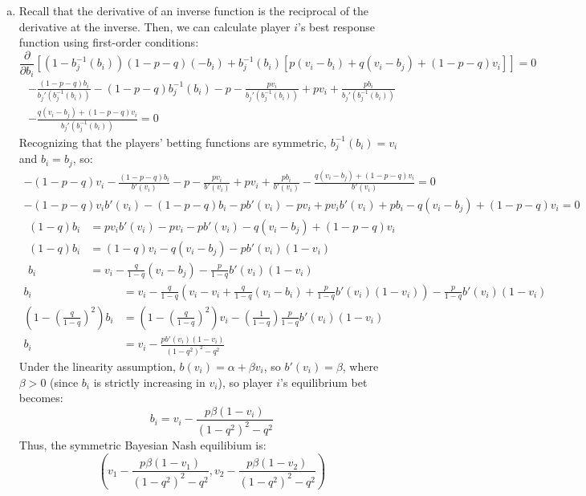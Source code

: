 \documentclass{article}
\newcommand{\binv}[1]{b_j^{-1}\left(#1\right)}
\begin{document}
\begin{enumerate}[(a)]
	
	\item Recall that the derivative of an inverse function is the reciprocal of the derivative at the inverse. Then, we can calculate player $i$'s best response function using first-order conditions:
		$$ \frac{\partial}{\partial b_i}\left[(1-\binv{b_i})(1-p-q)(-b_i) + \binv{b_i}[p(v_i-b_i) + q(v_i-b_j) + (1-p-q)v_i]\right] = 0	$$
		\begin{align*}
			-\frac{(1-p-q)b_i}{b_j'\left(\binv{b_i}\right)} - (1-p-q)\binv{b_i} -p - \frac{pv_i}{b_j'\left(\binv{b_i}\right)} + pv_i + \frac{pb_i}{b_j'\left(\binv{b_i}\right)} 	\\
				- \frac{q(v_i-b_j) + (1-p-q)v_i}{b_j'\left(\binv{b_i}\right)} = 0
		\end{align*}
		Recognizing that the players' betting functions are symmetric, ${\binv{b_i}=v_i}$ and ${b_i=b_j}$, so:
		{\small
		\begin{align*}
			-(1-p-q)v_i - \frac{(1-p-q)b_i}{b'(v_i)}-p-\frac{pv_i}{b'(v_i)} + pv_i + \frac{pb_i}{b'(v_i)} - \frac{q(v_i-b_j) + (1-p-q)v_i}{b'(v_i)} = 0	\\
			-(1-p-q)v_ib'(v_i) - (1-p-q)b_i - pb'(v_i) - pv_i + pv_ib'(v_i) + pb_i - q(v_i-b_j) + (1-p-q)v_i = 0
		\end{align*}
		\begin{align*}
			(1-q)b_i 	&= pv_ib'(v_i) - pv_i - pb'(v_i) - q(v_i - b_j) + (1-p-q)v_i 	\\
			(1-q)b_i 	&= (1-q)v_i - q(v_i-b_j) - pb'(v_i)(1-v_i)						\\
			b_i			&= v_i - \frac{q}{1-q}(v_i-b_j) - \frac{p}{1-q}b'(v_i)(1-v_i)	
		\end{align*}
		\begin{align*}
			b_i			&= v_i - \frac{q}{1-q}\left(v_i-v_i + \frac{q}{1-q}(v_i-b_i) + \frac{p}{1-q}b'(v_i)(1-v_i)\right) - \frac{p}{1-q}b'(v_i)(1-v_i)	 \\
			\left(1-\left(\frac{q}{1-q}\right)^2\right)b_i &= \left(1-\left(\frac{q}{1-q}\right)^2\right)v_i - \left(\frac{1}{1-q}\right)\frac{p}{1-q}b'(v_i)(1-v_i)	\\
			b_i &= v_i - \frac{pb'(v_i)(1-v_i)}{(1-q^2)^2 - q^2}
		\end{align*}
		}%
		Under the linearity assumption, ${b(v_i) = \alpha + \beta v_i}$, so ${b'(v_i) = \beta}$, where ${\beta>0}$ (since $b_i$ is strictly increasing in $v_i$), so player $i$'s equilibrium bet becomes:
		\[
			b_i = v_i - \frac{p\beta(1-v_i)}{(1-q^2)^2 - q^2}
		\]
		Thus, the symmetric Bayesian Nash equilibium is:
		\[
			\left(v_1 - \frac{p\beta(1-v_1)}{(1-q^2)^2 - q^2},v_2 - \frac{p\beta(1-v_2)}{(1-q^2)^2 - q^2}\right)
		\]
	

\end{enumerate}
\end{document}

